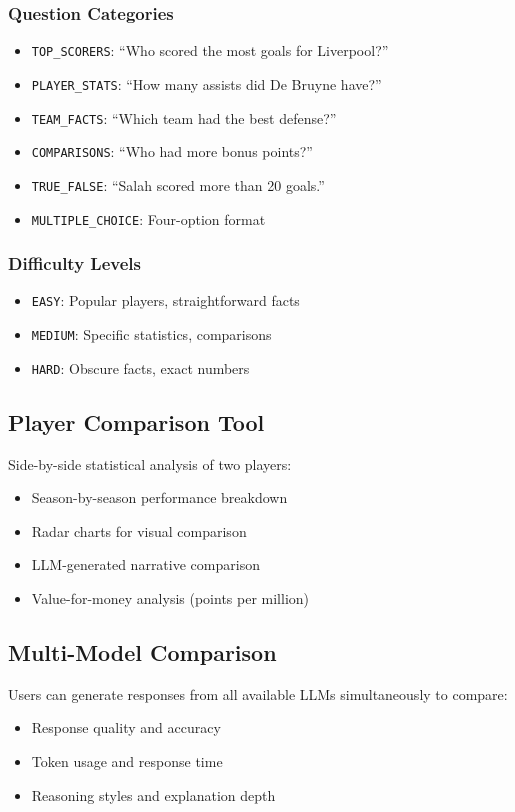 \documentclass[11pt, a4paper]{article}
\begin{document}
\subsubsection{Question Categories}
\begin{itemize}
    \item \texttt{TOP\_SCORERS}: ``Who scored the most goals for Liverpool?''
    \item \texttt{PLAYER\_STATS}: ``How many assists did De Bruyne have?''
    \item \texttt{TEAM\_FACTS}: ``Which team had the best defense?''
    \item \texttt{COMPARISONS}: ``Who had more bonus points?''
    \item \texttt{TRUE\_FALSE}: ``Salah scored more than 20 goals.''
    \item \texttt{MULTIPLE\_CHOICE}: Four-option format
\end{itemize}

\subsubsection{Difficulty Levels}
\begin{itemize}
    \item \texttt{EASY}: Popular players, straightforward facts
    \item \texttt{MEDIUM}: Specific statistics, comparisons
    \item \texttt{HARD}: Obscure facts, exact numbers
\end{itemize}

\subsection{Player Comparison Tool}
Side-by-side statistical analysis of two players:
\begin{itemize}
    \item Season-by-season performance breakdown
    \item Radar charts for visual comparison
    \item LLM-generated narrative comparison
    \item Value-for-money analysis (points per million)
\end{itemize}

\subsection{Multi-Model Comparison}
Users can generate responses from all available LLMs simultaneously to compare:
\begin{itemize}
    \item Response quality and accuracy
    \item Token usage and response time
    \item Reasoning styles and explanation depth
\end{itemize}
\end{document}

